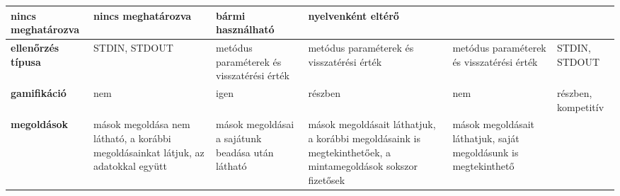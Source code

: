 {\begin{tabularx}{\textwidth}{@{}X|X|X|X|X|X@{}}
        nincs meghatározva                                                                                          &
        nincs meghatározva                                                                                          &
        bármi használható                                                                                           &
        nyelvenként eltérő                                                                                            \\ \hline
        \textbf{ellenőrzés típusa}                                                                                  &
        STDIN, STDOUT                                                                                               &
        metódus paraméterek és visszatérési érték                                                                   &
        metódus paraméterek és visszatérési érték                                                                   &
        metódus paraméterek és visszatérési érték                                                                   &
        STDIN, STDOUT                                                                                                 \\ \hline
        \textbf{gamifikáció}                                                                                        &
        nem                                                                                                         &
        igen                                                                                                        &
        részben                                                                                                     &
        nem                                                                                                         &
        részben, kompetitív                                                                                           \\ \hline
        \textbf{megoldások}                                                                                         &
        mások megoldása nem látható, a korábbi megoldásainkat látjuk, az adatokkal együtt                           &
        mások megoldásai a sajátunk beadása után látható                                                            &
        mások megoldásait láthatjuk, a korábbi megoldásaink is megtekinthetőek, a mintamegoldások sokszor fizetősek &
        mások megoldásait láthatjuk, saját megoldásunk is megtekinthető                                             &

\end{tabularx}}
